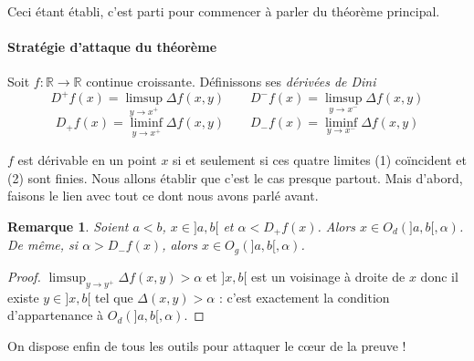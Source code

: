 \documentclass[a4paper, 11pt]{article}
\def\R{\mathbb{R}}
\newtheorem*{remark}{Remarque}
\begin{document}
Ceci étant établi, c'est parti pour commencer à parler du théorème principal.

\paragraph{Stratégie d'attaque du théorème}
Soit $f : \R \to \R$ continue croissante. Définissons ses \emph{dérivées de Dini}
\[ D^+f(x) = \limsup_{y \to x^+} \Delta f(x,y) \qquad
  D^-f(x) = \limsup_{y \to x^-} \Delta f(x,y) \]
\[  D_+f(x) = \liminf_{y \to x^+} \Delta f(x,y) \qquad
  D_-f(x) = \liminf_{y \to x^-} \Delta f(x,y) \]

$f$ est dérivable en un point $x$ si et seulement si ces quatre limites (1)
coïncident et (2) sont finies. Nous allons établir que c'est le cas presque
partout. Mais d'abord, faisons le lien avec tout ce dont nous avons parlé avant.

\begin{remark}
  Soient $a < b$, $x \in ]a,b[$ et $\alpha < D_+f(x)$. Alors $x \in O_d(]a,b[,
  \alpha)$. De même, si $\alpha > D_-f(x)$, alors $x \in O_g(]a,b[, \alpha)$.
\end{remark}
\begin{proof}
  $\limsup_{y \to y^+} \Delta f(x,y) > \alpha$ et $]x,b[$ est un voisinage à
  droite de $x$ donc il existe $y \in ]x,b[$ tel que $\Delta(x,y) > \alpha$ :
  c'est exactement la condition d'appartenance à $O_d(]a,b[,\alpha)$.
\end{proof}

On dispose enfin de tous les outils pour attaquer le cœur de la preuve !
\end{document}
